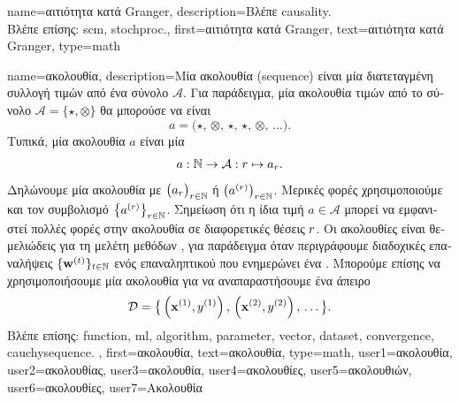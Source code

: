 {name={\foreignlanguage{greek}{αιτιότητα κατά} Granger},
	description={\foreignlanguage{greek}{Βλέπε} \gls{causality}.
		\\
		\foreignlanguage{greek}{Βλέπε επίσης:} \gls{scm}, \gls{stochproc}.},
	first={\foreignlanguage{greek}{αιτιότητα κατά} Granger},
	text={\foreignlanguage{greek}{αιτιότητα κατά} Granger},
	type=math
}

{name={\foreignlanguage{greek}{ακολουθία}},
	description={\foreignlanguage{greek}{Μία ακολουθία} 
		(sequence) \foreignlanguage{greek}{είναι μία διατεταγμένη συλλογή τιμών από ένα σύνολο 
		$\mathcal{A}$. Για παράδειγμα, μία ακολουθία τιμών από το σύνολο 
	   	$\mathcal{A} = \{ \star, \otimes \}$ θα μπορούσε να είναι  
	   	$$ a = \big( \star, \,\otimes, \,\star, \,\star, \,\otimes, \,\ldots \big). $$
	   	Τυπικά, μία ακολουθία $a$ είναι μία}  \cite{RudinBookPrinciplesMatheAnalysis} 
        		\[
            	a: \mathbb{N} \rightarrow \mathcal{A}: r \mapsto a_r.
        		\]        
		\foreignlanguage{greek}{Δηλώνουμε μία ακολουθία με $\big( a_{r} \big)_{r \in \mathbb{N}}$ 
		ή $\big( a^{(r)} \big)_{r \in \mathbb{N}}$. Μερικές φορές χρησιμοποιούμε  
		και τον συμβολισμό $\big\{ a^{(r)} \big\}_{r \in \mathbb{N}}$. 
        		Σημείωση ότι η ίδια τιμή $a \in \mathcal{A}$ μπορεί να εμφανιστεί πολλές φορές  
		στην ακολουθία σε διαφορετικές θέσεις $r$. 		
        		Οι ακολουθίες είναι θεμελιώδεις για τη μελέτη μεθόδων} , 
        		\foreignlanguage{greek}{για παράδειγμα όταν περιγράφουμε διαδοχικές επαναλήψεις  
        		$\{{\bf w}^{(t)}\}_{t \in \mathbb{N}}$ ενός επαναληπτικού} 
		 \foreignlanguage{greek}{που ενημερώνει ένα}  . 
		\foreignlanguage{greek}{Μπορούμε επίσης να χρησιμοποιήσουμε μία 
		ακολουθία για να αναπαραστήσουμε ένα άπειρο}  
		$$\mathcal{D} = \big\{ \left( {\bf x}^{(1)},y^{(1)} \right),\,\left( {\bf x}^{(2)},y^{(2)} \right),\,\ldots \big\}.$$
		\foreignlanguage{greek}{Βλέπε επίσης:} \gls{function}, \gls{ml}, \gls{algorithm}, \gls{parameter}, \gls{vector}, \gls{dataset}, 
		\gls{convergence}, \gls{cauchysequence}. }, 
	first={\foreignlanguage{greek}{ακολουθία}},
	text={\foreignlanguage{greek}{ακολουθία}},
	type=math,
	user1={\foreignlanguage{greek}{ακολουθία}}, %
  	user2={\foreignlanguage{greek}{ακολουθίας}}, %
	user3={\foreignlanguage{greek}{ακολουθία}}, %
	user4={\foreignlanguage{greek}{ακολουθίες}}, %
  	user5={\foreignlanguage{greek}{ακολουθιών}}, %
	user6={\foreignlanguage{greek}{ακολουθίες}}, %
	user7={\foreignlanguage{greek}{Ακολουθία}} %
}

